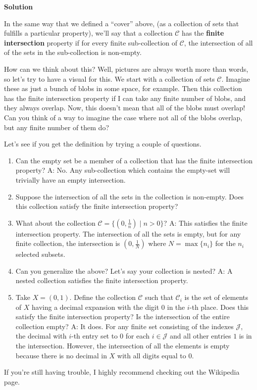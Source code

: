 \documentclass[12pt]{article}
\newcounter{AnswerCounter}
\newcounter{SubAnswerCounter}
\newenvironment{answer}[0]{
  \setcounter{SubAnswerCounter}{1}
  \bigskip
  \textbf{Solution \arabic{AnswerCounter}}
  \\
  \begin{small}
}{
  \end{small}
  \stepcounter{AnswerCounter}
}
\begin{document}
\begin{answer}[Problem 1]
In the same way that we defined a ``cover'' above, (as a collection of sets that fulfills a particular property), we'll say that a collection $\mathcal{C}$ has the \textbf{finite intersection} property if for every finite sub-collection of $\mathcal{C}$, the intersection of all of the sets in the sub-collection is non-empty.

How can we think about this? Well, pictures are always worth more than words, so let's try to have a visual for this. We start with a collection of sets $\mathcal{C}$. Imagine these as just a bunch of blobs in some space, for example. Then this collection has the finite intersection property if I can take any finite number of blobs, and they always overlap. Now, this doesn't mean that all of the blobs must overlap! Can you think of a way to imagine the case where not all of the blobs overlap, but any finite number of them do?

Let's see if you get the definition by trying a couple of questions.

\begin{enumerate}
\item Can the empty set be a member of a collection that has the finite intersection property? A: No. Any sub-collection which contains the empty-set will trivially have an empty intersection.
\item Suppose the intersection of all the sets in the collection is non-empty. Does this collection satisfy the finite intersection property?
\item What about the collection $\mathcal{C} = \{ (0,\frac{1}{n}) \mid n > 0 \}$?
A: This satisfies the finite intersection property. The intersection of all the sets is empty, but for any finite collection, the intersection is $(0,\frac{1}{N})$ where $N = \max\{ n_i \}$ for the $n_i$ selected subsets.
\item Can you generalize the above? Let's say your collection is nested? A: A nested collection satisfies the finite intersection property.
\item Take $X = (0,1)$. Define the collection $\mathcal{C}$ such that $\mathcal{C}_i$ is the set of elements of $X$ having a decimal expansion with the digit $0$ in the $i$-th place. Does this satisfy the finite intersection property? Is the intersection of the entire collection empty?
A: It does. For any finite set consisting of the indexes $\mathcal{J}$, the decimal with $i$-th entry set to $0$ for each $i \in \mathcal{J}$ and all other entries $1$ is in the intersection. However, the intersection of all the elements is empty because there is no decimal in $X$ with all digits equal to $0$.
\end{enumerate}
If you're still having trouble, I highly recommend checking out the Wikipedia page.


\end{answer}
\end{document}
